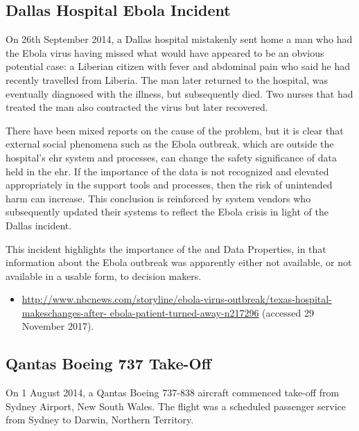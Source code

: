 \subsection{Dallas Hospital Ebola Incident} \label{bkm:incacc:dallasebola}
On 26th September 2014, a Dallas hospital mistakenly sent home a man who had the Ebola virus having missed what would have appeared to be an obvious potential case: a Liberian citizen with fever and abdominal pain who said he had recently travelled from Liberia. The man later returned to the hospital, was eventually diagnosed with the illness, but subsequently died. Two nurses that had treated the man also contracted the virus but later recovered.

There have been mixed reports on the cause of the problem, but it is clear that external social phenomena such as the Ebola outbreak, which are outside the hospital's \gls{ehr} system and processes, can change the safety significance of data held in the \gls{ehr}. If the importance of the data is not recognized and elevated appropriately in the support tools and processes, then the risk of unintended harm can increase. This conclusion is reinforced by system vendors who subsequently updated their systems to reflect the Ebola crisis in light of the Dallas incident.

This incident highlights the importance of the  and  Data Properties, in that information about the Ebola outbreak was apparently either not available, or not available in a usable form, to decision makers.

\begin{samepage}
\begin{itemize}
  \item \raggedright{\href{http://www.nbcnews.com/storyline/ebola-virus-outbreak/texas-hospital-makeschanges-after-ebola-patient-turned-away-n217296}{http://www.nbcnews.com/storyline/ebola-virus-outbreak/texas-hospital-makeschanges-after- ebola-patient-turned-away-n217296} (accessed 29 November 2017).} 
\end{itemize}
\end{samepage}


\subsection{Qantas Boeing 737 Take-Off} \label{bkm:incacc:qantastakeoff}
On 1 August 2014, a Qantas Boeing 737-838 aircraft commenced take-off from Sydney Airport, New South Wales. The flight was a scheduled passenger service from Sydney to Darwin, Northern Territory.

